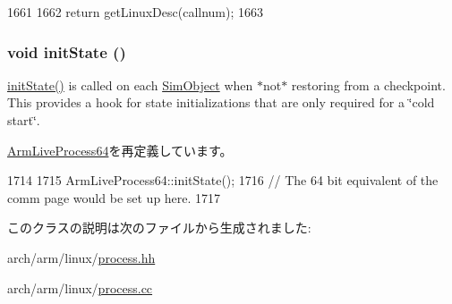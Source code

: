 \begin{DoxyCode}
1661 {
1662     return getLinuxDesc(callnum);
1663 }
\end{DoxyCode}
\hypertarget{classArmLinuxProcess64_a3c34ea9b29f410748d4435a667484924}{
\subsubsection[{initState}]{\setlength{\rightskip}{0pt plus 5cm}void initState ()}}
\label{classArmLinuxProcess64_a3c34ea9b29f410748d4435a667484924}
\hyperlink{classArmLinuxProcess64_a3c34ea9b29f410748d4435a667484924}{initState()} is called on each \hyperlink{classSimObject}{SimObject} when $\ast$not$\ast$ restoring from a checkpoint. This provides a hook for state initializations that are only required for a \char`\"{}cold start\char`\"{}. 

\hyperlink{classArmLiveProcess64_a3c34ea9b29f410748d4435a667484924}{ArmLiveProcess64}を再定義しています。


\begin{DoxyCode}
1714 {
1715     ArmLiveProcess64::initState();
1716     // The 64 bit equivalent of the comm page would be set up here.
1717 }
\end{DoxyCode}


このクラスの説明は次のファイルから生成されました:\begin{DoxyCompactItemize}
\item 
arch/arm/linux/\hyperlink{arch_2arm_2linux_2process_8hh}{process.hh}\item 
arch/arm/linux/\hyperlink{arch_2arm_2linux_2process_8cc}{process.cc}\end{DoxyCompactItemize}
